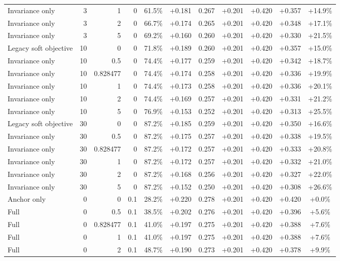 \begin{table}[htbp]
\begin{tabular}{lrrrccccccc}
Invariance only & 3 & 1 & 0 & 61.5\% & +0.181 & 0.267 & +0.201 & +0.420 & +0.357 & +14.9\% \\
Invariance only & 3 & 2 & 0 & 66.7\% & +0.174 & 0.265 & +0.201 & +0.420 & +0.348 & +17.1\% \\
Invariance only & 3 & 5 & 0 & 69.2\% & +0.160 & 0.260 & +0.201 & +0.420 & +0.330 & +21.5\% \\
Legacy soft objective & 10 & 0 & 0 & 71.8\% & +0.189 & 0.260 & +0.201 & +0.420 & +0.357 & +15.0\% \\
Invariance only & 10 & 0.5 & 0 & 74.4\% & +0.177 & 0.259 & +0.201 & +0.420 & +0.342 & +18.7\% \\
Invariance only & 10 & 0.828477 & 0 & 74.4\% & +0.174 & 0.258 & +0.201 & +0.420 & +0.336 & +19.9\% \\
Invariance only & 10 & 1 & 0 & 74.4\% & +0.173 & 0.258 & +0.201 & +0.420 & +0.336 & +20.1\% \\
Invariance only & 10 & 2 & 0 & 74.4\% & +0.169 & 0.257 & +0.201 & +0.420 & +0.331 & +21.2\% \\
Invariance only & 10 & 5 & 0 & 76.9\% & +0.153 & 0.252 & +0.201 & +0.420 & +0.313 & +25.5\% \\
Legacy soft objective & 30 & 0 & 0 & 87.2\% & +0.185 & 0.259 & +0.201 & +0.420 & +0.350 & +16.6\% \\
Invariance only & 30 & 0.5 & 0 & 87.2\% & +0.175 & 0.257 & +0.201 & +0.420 & +0.338 & +19.5\% \\
Invariance only & 30 & 0.828477 & 0 & 87.2\% & +0.172 & 0.257 & +0.201 & +0.420 & +0.333 & +20.8\% \\
Invariance only & 30 & 1 & 0 & 87.2\% & +0.172 & 0.257 & +0.201 & +0.420 & +0.332 & +21.0\% \\
Invariance only & 30 & 2 & 0 & 87.2\% & +0.168 & 0.256 & +0.201 & +0.420 & +0.327 & +22.0\% \\
Invariance only & 30 & 5 & 0 & 87.2\% & +0.152 & 0.250 & +0.201 & +0.420 & +0.308 & +26.6\% \\
Anchor only & 0 & 0 & 0.1 & 28.2\% & +0.220 & 0.278 & +0.201 & +0.420 & +0.420 & +0.0\% \\
Full & 0 & 0.5 & 0.1 & 38.5\% & +0.202 & 0.276 & +0.201 & +0.420 & +0.396 & +5.6\% \\
Full & 0 & 0.828477 & 0.1 & 41.0\% & +0.197 & 0.275 & +0.201 & +0.420 & +0.388 & +7.6\% \\
Full & 0 & 1 & 0.1 & 41.0\% & +0.197 & 0.275 & +0.201 & +0.420 & +0.388 & +7.6\% \\
Full & 0 & 2 & 0.1 & 48.7\% & +0.190 & 0.273 & +0.201 & +0.420 & +0.378 & +9.9\% \\

\end{tabular}
\end{table}
